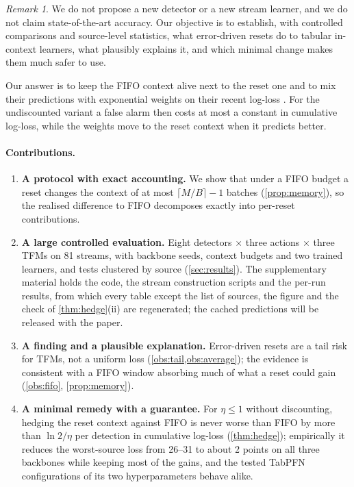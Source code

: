 \documentclass[10pt]{article}
\theoremstyle{definition}
\theoremstyle{remark}
\newtheorem{remark}{Remark}
\begin{document}
\begin{remark}
We do not propose a new detector or a new stream learner, and we do not claim state-of-the-art accuracy. Our objective
is to establish, with controlled comparisons and source-level statistics, what error-driven resets do to tabular
in-context learners, what plausibly explains it, and which minimal change makes them much safer to use.
\end{remark}

Our answer is to keep the FIFO context alive next to the reset one and to mix their predictions with exponential
weights on their recent log-loss \citep{vovk1990aggregating,cesabianchi2006prediction}. For the undiscounted variant a false alarm then costs
at most a constant in cumulative log-loss, while the weights move to the reset context when it predicts better.

\paragraph{Contributions.}
\begin{enumerate}
\item \textbf{A protocol with exact accounting.} We show that under a FIFO budget a reset changes the context of at
  most $\lceil M/B\rceil-1$ batches (\cref{prop:memory}), so the realised difference to FIFO decomposes
  exactly into per-reset contributions.
\item \textbf{A large controlled evaluation.} Eight detectors $\times$ three actions $\times$ three TFMs on 81 streams,
  with backbone seeds, context budgets and two trained learners, and tests clustered by source
  (\cref{sec:results}). The supplementary material holds the code, the stream construction scripts and the per-run results, from which every table except the list of sources, the figure and the check of \cref{thm:hedge}(ii) are regenerated; the cached predictions will be released with the paper.
\item \textbf{A finding and a plausible explanation.} Error-driven resets are a tail risk for TFMs, not a uniform
  loss (\cref{obs:tail,obs:average}); the evidence is consistent with a FIFO window absorbing much of what a reset
  could gain (\cref{obs:fifo}, \cref{prop:memory}).
\item \textbf{A minimal remedy with a guarantee.} For $\eta\le1$ without discounting, hedging the reset context against
  FIFO is never worse than FIFO by more than $\ln 2/\eta$ per detection in cumulative log-loss (\cref{thm:hedge});
  empirically it reduces the worst-source loss from 26--31 to about 2 points on all three backbones while keeping most
  of the gains, and the tested TabPFN configurations of its two hyperparameters behave alike.
\end{enumerate}
\end{document}

